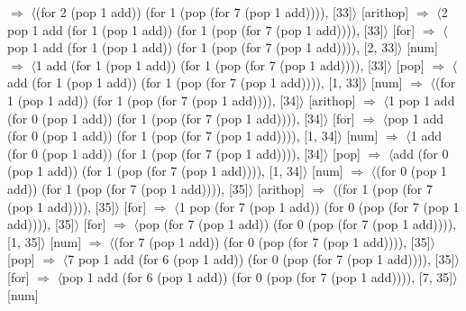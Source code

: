 \documentclass[12pt]{report}
\begin{document}
$\Rightarrow$ $\langle$(for 2 (pop 1 add)) (for 1 (pop (for 7 (pop 1 add)))), [33]$\rangle$ \hfill [arithop] \newline
$\Rightarrow$ $\langle$2 pop 1 add (for 1 (pop 1 add)) (for 1 (pop (for 7 (pop 1 add)))), [33]$\rangle$ \hfill [for] \newline
$\Rightarrow$ $\langle$pop 1 add (for 1 (pop 1 add)) (for 1 (pop (for 7 (pop 1 add)))), [2, 33]$\rangle$ \hfill [num] \newline
$\Rightarrow$ $\langle$1 add (for 1 (pop 1 add)) (for 1 (pop (for 7 (pop 1 add)))), [33]$\rangle$ \hfill [pop] \newline
$\Rightarrow$ $\langle$add (for 1 (pop 1 add)) (for 1 (pop (for 7 (pop 1 add)))), [1, 33]$\rangle$ \hfill [num] \newline
$\Rightarrow$ $\langle$(for 1 (pop 1 add)) (for 1 (pop (for 7 (pop 1 add)))), [34]$\rangle$ \hfill [arithop] \newline
$\Rightarrow$ $\langle$1 pop 1 add (for 0 (pop 1 add)) (for 1 (pop (for 7 (pop 1 add)))), [34]$\rangle$ \hfill [for] \newline
$\Rightarrow$ $\langle$pop 1 add (for 0 (pop 1 add)) (for 1 (pop (for 7 (pop 1 add)))), [1, 34]$\rangle$ \hfill [num] \newline
$\Rightarrow$ $\langle$1 add (for 0 (pop 1 add)) (for 1 (pop (for 7 (pop 1 add)))), [34]$\rangle$ \hfill [pop] \newline
$\Rightarrow$ $\langle$add (for 0 (pop 1 add)) (for 1 (pop (for 7 (pop 1 add)))), [1, 34]$\rangle$ \hfill [num] \newline
$\Rightarrow$ $\langle$(for 0 (pop 1 add)) (for 1 (pop (for 7 (pop 1 add)))), [35]$\rangle$ \hfill [arithop] \newline
$\Rightarrow$ $\langle$(for 1 (pop (for 7 (pop 1 add)))), [35]$\rangle$ \hfill [for] \newline
$\Rightarrow$ $\langle$1 pop (for 7 (pop 1 add)) (for 0 (pop (for 7 (pop 1 add)))), [35]$\rangle$ \hfill [for] \newline
$\Rightarrow$ $\langle$pop (for 7 (pop 1 add)) (for 0 (pop (for 7 (pop 1 add)))), [1, 35]$\rangle$ \hfill [num] \newline
$\Rightarrow$ $\langle$(for 7 (pop 1 add)) (for 0 (pop (for 7 (pop 1 add)))), [35]$\rangle$ \hfill [pop] \newline
$\Rightarrow$ $\langle$7 pop 1 add (for 6 (pop 1 add)) (for 0 (pop (for 7 (pop 1 add)))), [35]$\rangle$ \hfill [for] \newline
$\Rightarrow$ $\langle$pop 1 add (for 6 (pop 1 add)) (for 0 (pop (for 7 (pop 1 add)))), [7, 35]$\rangle$ \hfill [num] \newline
\end{document}
